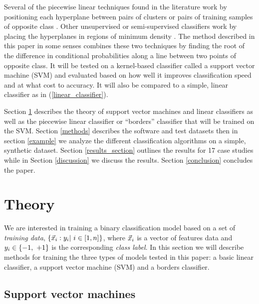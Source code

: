Several of the piecewise linear techniques found in the literature work by
positioning each hyperplane between pairs of clusters or pairs of training
samples of opposite class 
\citep{Sklansky_Michelotti1980,Tenmoto_etal1998,Kostin2006,Gai_Zhang2010}.
Other unsupervised or semi-supervised classifiers work by placing the 
hyperplanes in regions of minimum density \citep{Pavlidis_etal2016}.
The method described in this paper in some senses combines these two techniques
by finding the root of the difference in conditional probabilities along a
line between two points of opposite class.
It will be tested on a kernel-based classifier called a support vector
machine (SVM) \citep{Michie_etal1994,Mueller_etal2001}
and evaluated based on how
well it improves classification speed and at what cost to accuracy.
It will also be compared to a simple, linear classifier as in (\ref{linear_classifier}).

Section \ref{theory} describes the theory of support
vector machines and linear classifiers
as well as the piecewise linear classifier or ``borders'' classifier
that will be trained on the SVM.
Section \ref{methods} describes the software and test datasets then in
section \ref{example} we analyze the different classification algorithms on
a simple, synthetic dataset.
Section \ref{results_section} outlines the results for 17 case studies
while in Section \ref{discussion} we discuss the results.
Section \ref{conclusion} concludes the paper.

\section{Theory}

\label{theory}

We are interested in training a binary classification model based on a set of 
{\it training data}, $\lbrace \vec {x}_i: y_i|~i \in [1,n] \rbrace$, where $\vec {x}_i$
is a vector of features data and 
$y_i \in \lbrace -1,~ +1 \rbrace$ is the corresponding
{\it class label}.
In this section we will describe methods for training the three types of
models tested in this paper: a basic linear classifier, a support vector
machine (SVM) and a borders classifier.

\subsection{Support vector machines}

